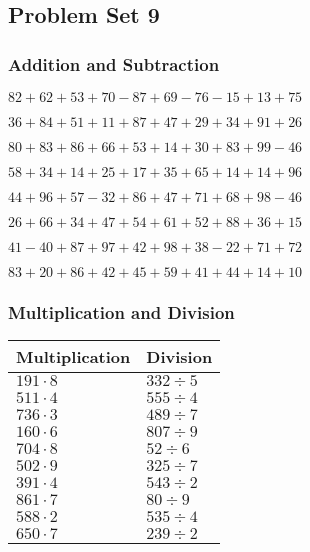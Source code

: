 \hypertarget{problem-set-9}{%
\subsection{Problem Set 9}\label{problem-set-9}}

\hypertarget{addition-and-subtraction}{%
\subsubsection{Addition and
Subtraction}\label{addition-and-subtraction}}

\(82+62+53+70-87+69-76-15+13+75\)

\(36+84+51+11+87+47+29+34+91+26\)

\(80+83+86+66+53+14+30+83+99-46\)

\(58+34+14+25+17+35+65+14+14+96\)

\(44+96+57-32+86+47+71+68+98-46\)

\(26+66+34+47+54+61+52+88+36+15\)

\(41-40+87+97+42+98+38-22+71+72\)

\(83+20+86+42+45+59+41+44+14+10\)

\hypertarget{multiplication-and-division}{%
\subsubsection{Multiplication and
Division}\label{multiplication-and-division}}

\begin{longtable}[]{@{}ll@{}}
\toprule
Multiplication & Division\tabularnewline
\midrule
\endhead
\(191\cdot8\) & \(332÷5\)\tabularnewline
\(511\cdot4\) & \(555÷4\)\tabularnewline
\(736\cdot3\) & \(489÷7\)\tabularnewline
\(160\cdot6\) & \(807÷9\)\tabularnewline
\(704\cdot8\) & \(52÷6\)\tabularnewline
\(502\cdot9\) & \(325÷7\)\tabularnewline
\(391\cdot4\) & \(543÷2\)\tabularnewline
\(861\cdot7\) & \(80÷9\)\tabularnewline
\(588\cdot2\) & \(535÷4\)\tabularnewline
\(650\cdot7\) & \(239÷2\)\tabularnewline
\bottomrule
\end{longtable}
